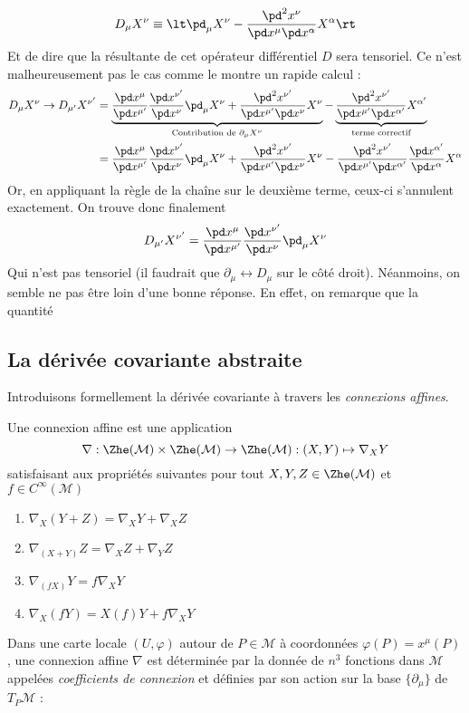 \begin{equation}
    D_\mu X^\nu \equiv \lt \pd_\mu X^\nu - \frac{\pd^2 x^{\nu}}{\pd x^{\mu}\pd x^{\alpha}} X^\alpha \rt 
\end{equation}
Et de dire que la résultante de cet opérateur différentiel $D$ sera tensoriel. Ce n'est malheureusement pas le cas comme le montre un rapide calcul :
\begin{align}
    D_\mu X^\nu \to D_{\mu'} X^{\nu'} &= \underbrace{\frac{\pd x^\mu}{\pd x^{\mu'}} \frac{\pd x^{\nu'}}{\pd x^{\nu}} \pd_\mu X^\nu + \frac{\pd^2 x^{\nu'}}{\pd x^{\mu'}\pd x^{\nu}} X^\nu}_{\text{Contribution de } \partial_\mu X^\nu} - \underbrace{\frac{\pd^2 x^{\nu'}}{\pd x^{\mu'}\pd x^{\alpha'}} X^{\alpha'}}_\text{terme correctif}\\
    & = \frac{\pd x^\mu}{\pd x^{\mu'}} \frac{\pd x^{\nu'}}{\pd x^{\nu}} \pd_\mu X^\nu+ \frac{\pd^2 x^{\nu'}}{\pd x^{\mu'}\pd x^{\nu}} X^\nu  - \frac{\pd^2 x^{\nu'}}{\pd x^{\mu'}\pd x^{\alpha'}} \frac{\pd x^{\alpha'}}{\pd x^\alpha}X^{\alpha}
\end{align}
Or, en appliquant la règle de la chaîne sur le deuxième terme, ceux-ci s'annulent exactement. On trouve donc finalement
\begin{equation}
    D_{\mu'} X^{\nu'} = \frac{\pd x^\mu}{\pd x^{\mu'}} \frac{\pd x^{\nu'}}{\pd x^{\nu}} \pd_\mu X^\nu
\end{equation}
Qui n'est pas tensoriel (il faudrait que $\partial_\mu \leftrightarrow D_\mu$ sur le côté droit). Néanmoins, on semble ne pas être loin d'une bonne réponse. En effet, on remarque que la quantité 
\subsection{La dérivée covariante abstraite}
Introduisons formellement la dérivée covariante à travers les \emph{connexions affines}.
\begin{theoremframe}
    \begin{defi}
    \label{def:connexion affine}
        Une connexion affine est une application 
        $$\nabla : \Zhe(\mathcal{M})\times \Zhe(\mathcal{M}) \to \Zhe (\mathcal{M}):(X, Y) \mapsto \nabla_{X}Y $$
        satisfaisant aux propriétés suivantes pour tout $ X, Y, Z \in \Zhe(\mathcal{M})$ et $ f \in C^{\infty}(\mathcal{M})$
        \begin{enumerate}[label=(\roman*)]
            \item $\nabla_{X}(Y+Z) = \nabla_{X}Y + \nabla_{X}Z$
            \item $\nabla_{(X+Y)} Z = \nabla_{X} Z+\nabla_{Y}Z$
            \item $\nabla_{(fX)}Y = f\nabla_{X}Y$
            \item $\nabla_{X}(fY) = X(f)Y + f\nabla_{X}Y$
        \end{enumerate}
    \end{defi}
\end{theoremframe}
Dans une carte locale $(U, \varphi)$ autour de $P\in \mathcal{M}$ à coordonnées $\varphi(P) = x^{\mu}(P)$, 
une connexion affine $\nabla$ est déterminée par la donnée de $n^3$ fonctions dans $\mathcal{M}$ appelées \textit{coefficients de connexion } et définies par son action sur la base $\{\partial_{\mu}\}$ de $T_{P}\mathcal{M}$ :

